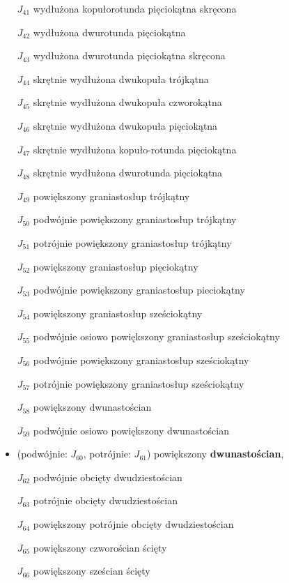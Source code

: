 \begin{itemize}
    \item [$J_{41}$] {wydłużona kopułorotunda pięciokątna skręcona}
    \item [$J_{42}$] {wydłużona dwurotunda pięciokątna}
    \item [$J_{43}$] {wydłużona dwurotunda pięciokątna skręcona}
    \item [$J_{44}$] {skrętnie wydłużona dwukopuła trójkątna}
    \item [$J_{45}$] {skrętnie wydłużona dwukopuła czworokątna}
    \item [$J_{46}$] {skrętnie wydłużona dwukopuła pięciokątna}
    \item [$J_{47}$] {skrętnie wydłużona kopuło-rotunda pięciokątna}
    \item [$J_{48}$] {skrętnie wydłużona dwurotunda pięciokątna}
    \item [$J_{49}$] {powiększony graniastosłup trójkątny}
    \item [$J_{50}$] {podwójnie powiększony graniastosłup trójkątny}
    \item [$J_{51}$] {potrójnie powiększony graniastosłup trójkątny}
    \item [$J_{52}$] {powiększony graniastosłup pięciokątny}
    \item [$J_{53}$] {podwójnie powiększony graniastosłup pieciokątny}
    \item [$J_{54}$] {powiększony graniastosłup sześciokątny}
    \item [$J_{55}$] {podwójnie osiowo powiększony graniastosłup sześciokątny}
    \item [$J_{56}$] {podwójnie powiększony graniastosłup sześciokątny}
    \item [$J_{57}$] {potrójnie powiększony graniastosłup sześciokątny}
    \item [$J_{58}$] {powiększony dwunastościan}
    \item [$J_{59}$] {podwójnie osiowo powiększony dwunastościan}
    \item {(podwójnie: $J_{60}$, potrójnie: $J_{61}$) powiększony \textbf{dwunastościan}},
    \item [$J_{62}$] {podwójnie obcięty dwudziestościan}
    \item [$J_{63}$] {potrójnie obcięty dwudziestościan}
    \item [$J_{64}$] {powiększony potrójnie obcięty dwudziestościan}
    \item [$J_{65}$] {powiększony czworościan ścięty}
    \item [$J_{66}$] {powiększony sześcian ścięty}

\end{itemize}

